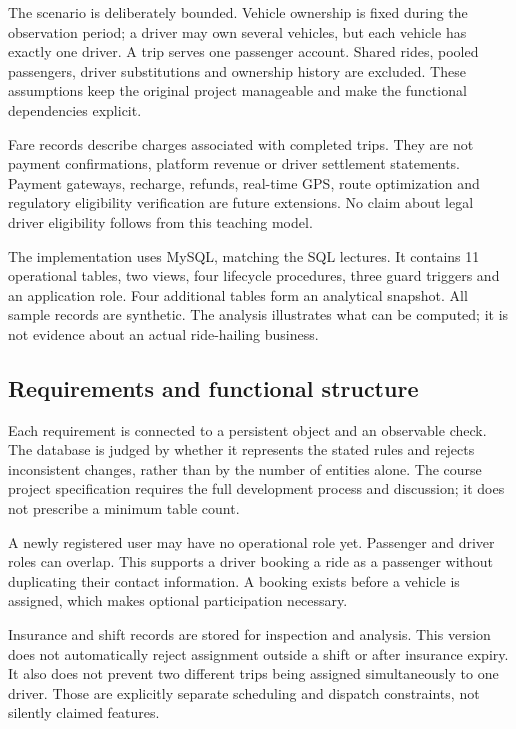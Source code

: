 \documentclass[11pt,a4paper]{article}
\begin{document}
The scenario is deliberately bounded. Vehicle ownership is fixed during the observation period; a driver may own several vehicles, but each vehicle has exactly one driver. A trip serves one passenger account. Shared rides, pooled passengers, driver substitutions and ownership history are excluded. These assumptions keep the original project manageable and make the functional dependencies explicit.

Fare records describe charges associated with completed trips. They are not payment confirmations, platform revenue or driver settlement statements. Payment gateways, recharge, refunds, real-time GPS, route optimization and regulatory eligibility verification are future extensions. No claim about legal driver eligibility follows from this teaching model.

The implementation uses MySQL, matching the SQL lectures. It contains 11 operational tables, two views, four lifecycle procedures, three guard triggers and an application role. Four additional tables form an analytical snapshot. All sample records are synthetic. The analysis illustrates what can be computed; it is not evidence about an actual ride-hailing business.


\subsection{Requirements and functional structure}
Each requirement is connected to a persistent object and an observable check. The database is judged by whether it represents the stated rules and rejects inconsistent changes, rather than by the number of entities alone. The course project specification requires the full development process and discussion; it does not prescribe a minimum table count.

A newly registered user may have no operational role yet. Passenger and driver roles can overlap. This supports a driver booking a ride as a passenger without duplicating their contact information. A booking exists before a vehicle is assigned, which makes optional participation necessary.

Insurance and shift records are stored for inspection and analysis. This version does not automatically reject assignment outside a shift or after insurance expiry. It also does not prevent two different trips being assigned simultaneously to one driver. Those are explicitly separate scheduling and dispatch constraints, not silently claimed features.
\end{document}
